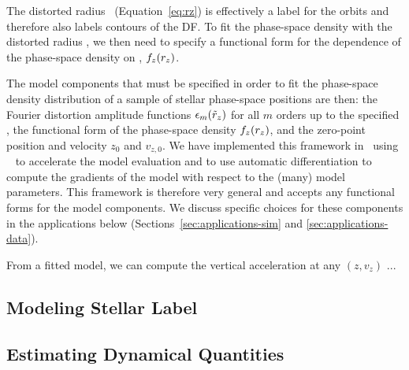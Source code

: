 The distorted radius \rz\ (Equation~\ref{eq:rz}) is effectively a label for the orbits
and therefore also labels contours of the DF.
To fit the phase-space density with the distorted radius \rz, we then need to specify
a functional form for the dependence of the phase-space density on \rz, $f_z(r_z)$.

The model components that must be specified in order to fit the phase-space density
distribution of a sample of stellar phase-space positions are then: the Fourier
distortion amplitude functions $\epsilon_m(\tilde{r}_z)$ for all $m$ orders up to the specified
\mmax, the functional form of the phase-space density $f_z(r_z)$, and the
zero-point position and velocity $z_0$ and $v_{z,0}$.
We have implemented this framework in \python\ using \jax\ \citep{jax:2018} to
accelerate the model evaluation and to use automatic differentiation to compute the
gradients of the model with respect to the (many) model parameters.
This framework is therefore very general and accepts any functional forms for the model
components.
We discuss specific choices for these components in the applications below
(Sections~\ref{sec:applications-sim} and \ref{sec:applications-data}).

From a fitted model, we can compute the vertical acceleration at any $(z, v_z)$ ...


\subsection{Modeling Stellar Label} \label{sec:stellarlabels}



\subsection{Estimating Dynamical Quantities} \label{sec:todo}

